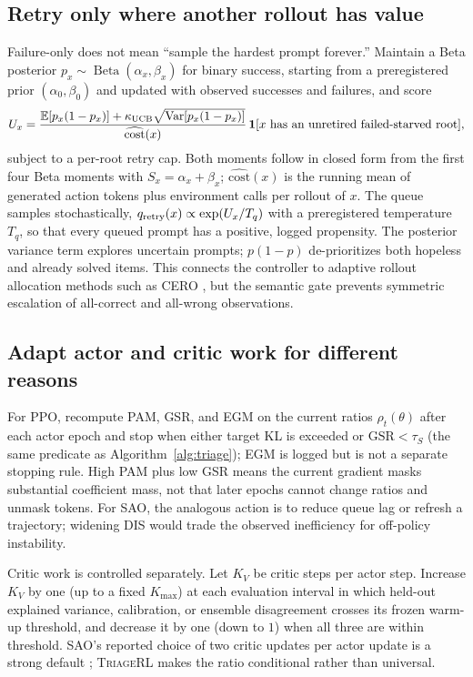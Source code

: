 \documentclass{article}
\newcommand{\method}{\textsc{TriageRL}\xspace}
\newcommand{\gsr}{\mathrm{GSR}}
\newcommand{\ind}{\mathbf{1}}
\newcommand{\E}{\mathbb{E}}
\begin{document}
\subsection{Retry only where another rollout has value}

Failure-only does not mean ``sample the hardest prompt forever.''  Maintain a
Beta posterior $p_x\sim\operatorname{Beta}(\alpha_x,\beta_x)$ for binary
success, starting from a preregistered prior $(\alpha_0,\beta_0)$ and updated
with observed successes and failures, and score
\begin{equation}
  U_x=\frac{
    \E[p_x(1-p_x)]+\kappa_{\rm UCB}\sqrt{\operatorname{Var}[p_x(1-p_x)]}}
    {\widehat{\mathrm{cost}}(x)}
  \,\ind[x\ \text{has an unretired failed-starved root}],
  \label{eq:retry-utility}
\end{equation}
subject to a per-root retry cap.  Both moments follow in closed form from the
first four Beta moments with $S_x=\alpha_x+\beta_x$; $\widehat{\mathrm{cost}}(x)$
is the running mean of generated action tokens plus environment calls per
rollout of $x$.  The queue samples stochastically,
$q_{\rm retry}(x)\propto\exp(U_x/T_q)$ with a preregistered temperature $T_q$,
so that every queued prompt has a positive, logged propensity.  The posterior variance term explores
uncertain prompts; $p(1-p)$ de-prioritizes both hopeless and already solved
items.  This connects the controller to adaptive rollout allocation methods
such as CERO \citep{zong2026cero}, but the semantic gate prevents symmetric
escalation of all-correct and all-wrong observations.

\subsection{Adapt actor and critic work for different reasons}

For PPO, recompute PAM, GSR, and EGM on the current ratios $\rho_t(\theta)$
after each actor epoch and stop when either target KL is exceeded or
$\gsr<\tau_S$ (the same predicate as Algorithm~\ref{alg:triage}); EGM is logged
but is not a separate stopping rule.  High
PAM plus low GSR means the current gradient masks substantial coefficient
mass, not that later epochs cannot change ratios and unmask tokens.
For SAO, the analogous action is to reduce queue lag or refresh a trajectory;
widening DIS would trade the observed inefficiency for off-policy instability.

Critic work is controlled separately.  Let $K_V$ be critic steps per actor
step.  Increase $K_V$ by one (up to a fixed $K_{\max}$) at each evaluation interval in
which held-out explained variance, calibration, or ensemble disagreement crosses
its frozen warm-up threshold, and decrease it by one (down to $1$) when all
three are within threshold.  SAO's
reported choice of two critic updates per actor update is a strong default
\citep{hou2026sao}; \method makes the ratio conditional rather than universal.
\end{document}
